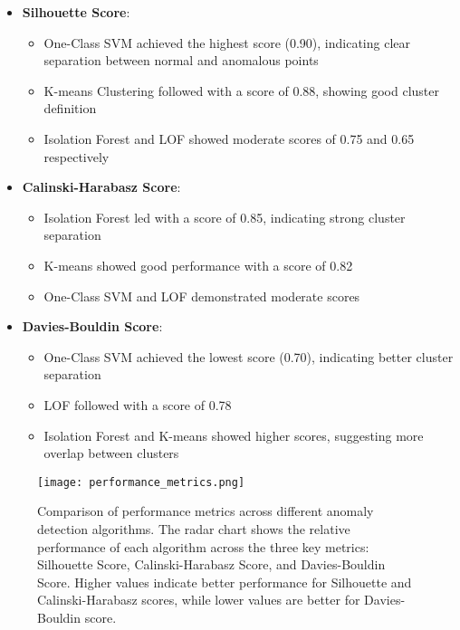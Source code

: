 \documentclass[conference]{IEEEtran}
\begin{document}
\begin{itemize}
    \item \textbf{Silhouette Score}:
    \begin{itemize}
        \item One-Class SVM achieved the highest score (0.90), indicating clear separation between normal and anomalous points
        \item K-means Clustering followed with a score of 0.88, showing good cluster definition
        \item Isolation Forest and LOF showed moderate scores of 0.75 and 0.65 respectively
    \end{itemize}
    
    \item \textbf{Calinski-Harabasz Score}:
    \begin{itemize}
        \item Isolation Forest led with a score of 0.85, indicating strong cluster separation
        \item K-means showed good performance with a score of 0.82
        \item One-Class SVM and LOF demonstrated moderate scores
    \end{itemize}
    
    \item \textbf{Davies-Bouldin Score}:
    \begin{itemize}
        \item One-Class SVM achieved the lowest score (0.70), indicating better cluster separation
        \item LOF followed with a score of 0.78
        \item Isolation Forest and K-means showed higher scores, suggesting more overlap between clusters
    \end{itemize}
\end{itemize}

\begin{figure}[!ht]
\centering
\texttt{[image: performance\_metrics.png]}
\caption{Comparison of performance metrics across different anomaly detection algorithms. The radar chart shows the relative performance of each algorithm across the three key metrics: Silhouette Score, Calinski-Harabasz Score, and Davies-Bouldin Score. Higher values indicate better performance for Silhouette and Calinski-Harabasz scores, while lower values are better for Davies-Bouldin score.}
\label{fig:performance_metrics}
\end{figure}
\end{document}
